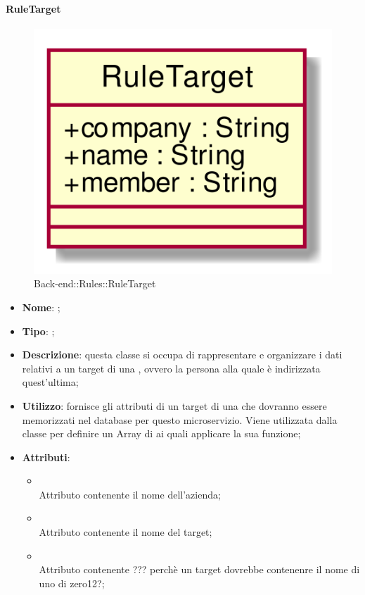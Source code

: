 \hypertarget{RuleTarget_label}{\paragraph{RuleTarget}}
\begin{figure}[h]
	\centering
	\includegraphics[width=\textwidth,height=\textheight,keepaspectratio]{images/ClassRuleTarget.png}
	\caption{Back-end::Rules::RuleTarget}
\end{figure}
\begin{itemize}
	\item \textbf{Nome}: ;
	\item \textbf{Tipo}: ;
	\item \textbf{Descrizione}: questa classe si occupa di rappresentare e organizzare i dati relativi a un target di una , ovvero la persona alla quale è indirizzata quest'ultima;
	\item \textbf{Utilizzo}: fornisce gli attributi di un target di una  che dovranno essere memorizzati nel database per questo microservizio.
Viene utilizzata dalla classe  per definire un Array di  ai quali applicare la sua funzione;
	\item \textbf{Attributi}:
	\begin{itemize}
		\item[]  \\
		Attributo contenente il nome dell'azienda;
		\item[]  \\
		Attributo contenente il nome del target;
		\item[]  \\
		Attributo contenente ??? perchè un target dovrebbe contenenre il nome di uno di zero12?;
	\end{itemize}
\end{itemize}
\FloatBarrier

